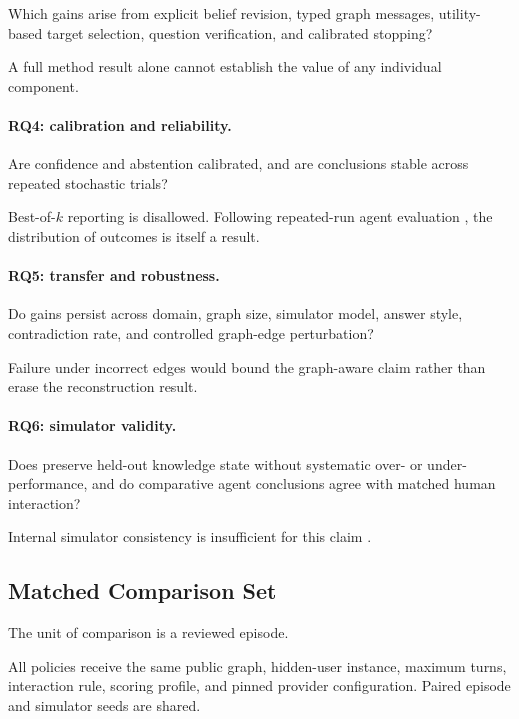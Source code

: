 Which gains arise from explicit belief revision, typed graph messages, utility-based target selection,
question verification, and calibrated stopping?

A full method result alone cannot establish the value of any individual component.

\paragraph{RQ4: calibration and reliability.}

Are confidence and abstention calibrated, and are conclusions stable across repeated stochastic trials?

Best-of-$k$ reporting is disallowed. Following repeated-run agent evaluation
\citep{yao2025taubench}, the distribution of outcomes is itself a result.

\paragraph{RQ5: transfer and robustness.}

Do gains persist across domain, graph size, simulator model, answer style, contradiction rate, and
controlled graph-edge perturbation?

Failure under incorrect edges would bound the graph-aware claim rather than erase the reconstruction
result.

\paragraph{RQ6: simulator validity.}

Does \sagesim preserve held-out knowledge state without systematic over- or under-performance, and do
comparative agent conclusions agree with matched human interaction?

Internal simulator consistency is insufficient for this claim \citep{dou2025simulatorarena}.

\subsection{Matched Comparison Set}

The unit of comparison is a reviewed episode.

All policies receive the same public graph, hidden-user instance, maximum turns, interaction rule,
scoring profile, and pinned provider configuration. Paired episode and simulator seeds are shared.

